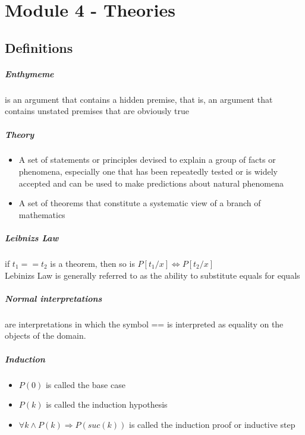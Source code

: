 \chapter{Module 4 - Theories}
  \section{Definitions}
    \paragraph{Enthymeme} is an argument that contains a hidden premise, that
    is, an argument that contains unstated premises that are obviously true

    \paragraph{Theory}
    \begin{itemize}
      \item A set of statements or principles devised to explain a group of
      facts or phenomena, especially one that has been repeatedly tested or is
      widely accepted and can be used to make predictions about natural
      phenomena
      \item A set of theorems that constitute a systematic view of a branch of
      mathematics
    \end{itemize}

    \paragraph{Leibnizs Law} if $t_1 == t_2$ is a theorem, then so is $P[ t_1 / x ]
    \Leftrightarrow P[ t_2 / x ]$\\
    Lebinizs Law is generally referred to as the ability to substitute equals
    for equals

    \paragraph{Normal interpretations} are interpretations in which the symbol
    == is interpreted as equality on the objects of the domain.

    \paragraph{Induction}
      \begin{itemize}
        \item $P(0)$ is called the base case
        \item $P(k)$ is called the induction hypothesis
        \item $\forall k \wedge P(k) \Rightarrow P(suc(k))$ is called the
        induction proof or inductive step
      \end{itemize}

